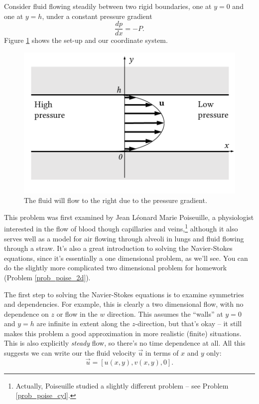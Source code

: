 Consider fluid flowing steadily between two rigid boundaries, one at $y=0$ and one at $y = h$, under a constant pressure gradient 
\[
\frac{dp}{dx} = -P.
\]
Figure \ref{fig_poise_setup} shows the set-up and our coordinate system.

\begin{figure}
\centering
\includegraphics[width=0.7\linewidth]{Figures/Chapter2/fig_poise_setup}
\caption{The fluid will flow to the right due to the pressure gradient.}
\label{fig_poise_setup}
\end{figure}

This problem was first examined by Jean L\'eonard Marie Poiseuille, a physiologist interested in the flow of blood though capillaries and veins,\footnote{Actually, Poiseuille studied a slightly different problem -- see Problem \ref{prob_poise_cyl}.} although it also serves well as a model for air flowing through alveoli in lungs and fluid flowing through a straw.  It's also a great introduction to solving the Navier-Stokes equations, since it's essentially a one dimensional problem, as we'll see.  You can do the slightly more complicated two dimensional problem for homework (Problem \ref{prob_poise_2d}).

The first step to solving the Navier-Stokes equations is to examine symmetries and dependencies.  For example, this is clearly a two dimensional flow, with no dependence on $z$ or flow in the $w$ direction.  This assumes the ``walls'' at $y=0$ and $y=h$ are infinite in extent along the $z$-direction, but that's okay -- it still makes this problem a good approximation in more realistic (finite) situations.  This is also explicitly \emph{steady} flow, so there's no time dependence at all.  All this suggests we can write our the fluid velocity $\vec{u}$ in terms of $x$ and $y$ only:
\[
\vec{u} = [ u(x, y), v(x, y), 0].
\]

